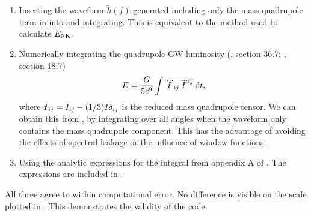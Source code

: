 \begin{enumerate}
\item Inserting the waveform $\widetilde{h}(f)$ generated including only the mass quadrupole term in  into  and integrating. This is equivalent to the method used to calculate $E_\mathrm{NK}$.
\item Numerically integrating the quadrupole GW luminosity (\citealt{Misner1973}, section 36.7; \citealt{Hobson2006}, section 18.7)
\begin{equation}
E = \frac{G}{5c^9}\intd{}{}{\dddot{\Ibar}_{ij}\dddot{\Ibar}^{ij}}{t},
\label{eq:E_quad}
\end{equation}
where $\Ibar_{ij} = I_{ij} - (1/3)I\delta_{ij}$ is the reduced mass quadrupole tensor. We can obtain this from , by integrating over all angles when the waveform only contains the mass quadrupole component. This has the advantage of avoiding the effects of spectral leakage or the influence of window functions.
\item Using the analytic expressions for the integral  from appendix A of \citet{Gair2005}. The expressions are included in .
\end{enumerate}
All three agree to within computational error. No difference is visible on the scale plotted in . This demonstrates the validity of the code.

